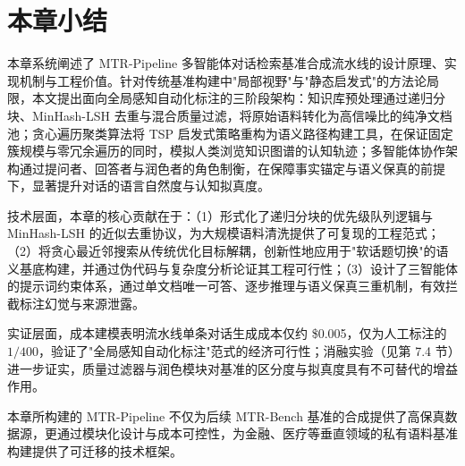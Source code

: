 \section{本章小结}

\label{sec:chapter5_summary}



本章系统阐述了 MTR-Pipeline 多智能体对话检索基准合成流水线的设计原理、实现机制与工程价值。针对传统基准构建中"局部视野"与"静态启发式"的方法论局限，本文提出面向全局感知自动化标注的三阶段架构：知识库预处理通过递归分块、MinHash-LSH 去重与混合质量过滤，将原始语料转化为高信噪比的纯净文档池；贪心遍历聚类算法将 TSP 启发式策略重构为语义路径构建工具，在保证固定簇规模与零冗余遍历的同时，模拟人类浏览知识图谱的认知轨迹；多智能体协作架构通过提问者、回答者与润色者的角色制衡，在保障事实锚定与语义保真的前提下，显著提升对话的语言自然度与认知拟真度。



技术层面，本章的核心贡献在于：（1）形式化了递归分块的优先级队列逻辑与 MinHash-LSH 的近似去重协议，为大规模语料清洗提供了可复现的工程范式；（2）将贪心最近邻搜索从传统优化目标解耦，创新性地应用于"软话题切换"的语义基底构建，并通过伪代码与复杂度分析论证其工程可行性；（3）设计了三智能体的提示词约束体系，通过单文档唯一可答、逐步推理与语义保真三重机制，有效拦截标注幻觉与来源泄露。



实证层面，成本建模表明流水线单条对话生成成本仅约 \$0.005，仅为人工标注的 $1/400$，验证了"全局感知自动化标注"范式的经济可行性；消融实验（见第 7.4 节）进一步证实，质量过滤器与润色模块对基准的区分度与拟真度具有不可替代的增益作用。



本章所构建的 MTR-Pipeline 不仅为后续 MTR-Bench 基准的合成提供了高保真数据源，更通过模块化设计与成本可控性，为金融、医疗等垂直领域的私有语料基准构建提供了可迁移的技术框架。